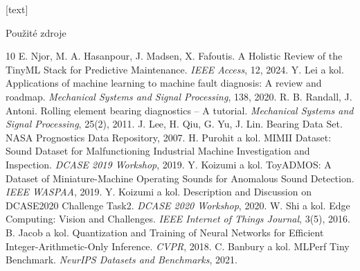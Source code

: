 \documentclass[aspectratio=169,11pt]{beamer}
\begin{document}
[text]
\begin{frame}{Použité zdroje}
  \scriptsize
  \begin{thebibliography}{10}
     E. Njor, M. A. Hasanpour, J. Madsen, X. Fafoutis. A Holistic Review of the TinyML Stack for Predictive Maintenance. \emph{IEEE Access}, 12, 2024.
     Y. Lei a kol. Applications of machine learning to machine fault diagnosis: A review and roadmap. \emph{Mechanical Systems and Signal Processing}, 138, 2020.
     R. B. Randall, J. Antoni. Rolling element bearing diagnostics -- A tutorial. \emph{Mechanical Systems and Signal Processing}, 25(2), 2011.
     J. Lee, H. Qiu, G. Yu, J. Lin. Bearing Data Set. NASA Prognostics Data Repository, 2007.
     H. Purohit a kol. MIMII Dataset: Sound Dataset for Malfunctioning Industrial Machine Investigation and Inspection. \emph{DCASE 2019 Workshop}, 2019.
     Y. Koizumi a kol. ToyADMOS: A Dataset of Miniature-Machine Operating Sounds for Anomalous Sound Detection. \emph{IEEE WASPAA}, 2019.
     Y. Koizumi a kol. Description and Discussion on DCASE2020 Challenge Task2. \emph{DCASE 2020 Workshop}, 2020.
     W. Shi a kol. Edge Computing: Vision and Challenges. \emph{IEEE Internet of Things Journal}, 3(5), 2016.
     B. Jacob a kol. Quantization and Training of Neural Networks for Efficient Integer-Arithmetic-Only Inference. \emph{CVPR}, 2018.
     C. Banbury a kol. MLPerf Tiny Benchmark. \emph{NeurIPS Datasets and Benchmarks}, 2021.
  \end{thebibliography}
\end{frame}
\end{document}
